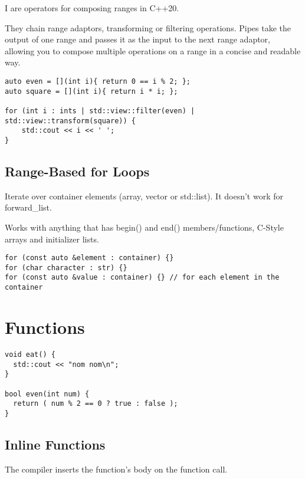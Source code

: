 I are operators for composing ranges in C++20.

They chain range adaptors, transforming or filtering operations.
Pipes take the output of one range and passes it as the input to the next range adaptor,
allowing you to compose multiple operations on a range in a concise and readable way.

\begin{verbatim}
auto even = [](int i){ return 0 == i % 2; };
auto square = [](int i){ return i * i; };

for (int i : ints | std::view::filter(even) | std::view::transform(square)) {
    std::cout << i << ' ';
}
\end{verbatim}

\subsection{Range-Based for Loops}

Iterate over container elements (array, vector or std::list). It doesn't work for forward\_list.

Works with anything that has begin()
and end() members/functions, C-Style arrays and initializer lists.

\begin{verbatim}
for (const auto &element : container) {}
for (char character : str) {}
for (const auto &value : container) {} // for each element in the container
\end{verbatim}

\section{Functions}

\begin{verbatim}
void eat() {
  std::cout << "nom nom\n";
}

bool even(int num) {
  return ( num % 2 == 0 ? true : false );
}
\end{verbatim}

\subsection{Inline Functions}

The compiler inserts the function’s body on the function call.

